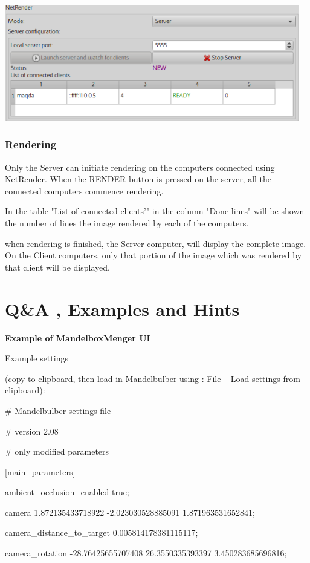 \includegraphics[width=5.07283in,height=1.99843in]{img/manual/media/image31.png}

\subsubsection{Rendering}\label{rendering}

Only the Server can initiate rendering on the computers connected using
NetRender. When the RENDER button is pressed on the server, all the
connected computers commence rendering.

In the table "List of connected clients'" in the column "Done lines"
will be shown the number of lines the image rendered by each of the
computers.

when rendering is finished, the Server computer, will display the
complete image. On the Client computers, only that portion of the image
which was rendered by that client will be displayed.

\section{Q\&A , Examples and Hints}\label{qa-examples-and-hints}

\textbf{Example of MandelboxMenger UI}

Example settings

(copy to clipboard, then load in Mandelbulber using : File -- Load
settings from clipboard):

\# Mandelbulber settings file

\# version 2.08

\# only modified parameters

{[}main\_parameters{]}

ambient\_occlusion\_enabled true;

camera 1.872135433718922 -2.023030528885091 1.871963531652841;

camera\_distance\_to\_target 0.005814178381115117;

camera\_rotation -28.76425655707408 26.3550335393397 3.450283685696816;

